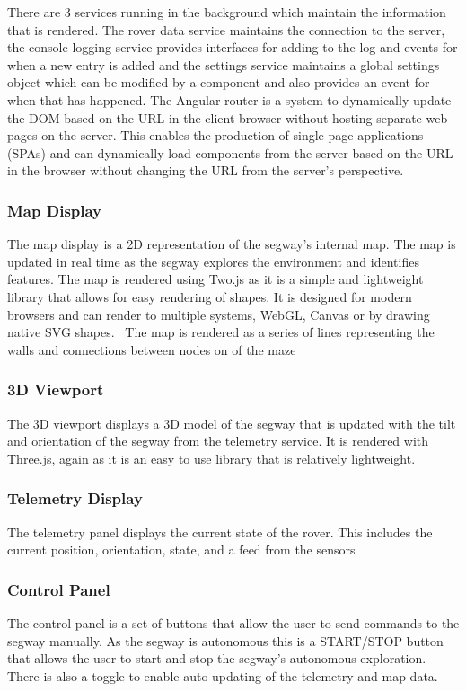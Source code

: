 There are 3 services running in the background which maintain the information that is rendered. 
The rover data service maintains the connection to the server, 
the console logging service provides interfaces for adding to the log and events for when a new entry is added and the settings service maintains a global settings object which can be modified by a component and also provides an event for when that has happened.
The Angular router is a system to dynamically update the DOM based on the URL in the client browser without hosting separate web pages on the server. This enables the production of single page applications (SPAs) and can dynamically load components from the server based on the URL in the browser without changing the URL from the server’s perspective.~\cite{ref:angular_router}

\subsubsection*{Map Display}
The map display is a 2D representation of the segway's internal map. The map is updated in real time as the segway explores the environment and identifies features. The map is rendered using Two.js as it is a simple and lightweight library that allows for easy rendering of shapes. It is designed for modern browsers and can render to multiple systems, WebGL, Canvas or by drawing native SVG shapes.~\cite{ref:twojs} The map is rendered as a series of lines representing the walls and connections between nodes on of the maze

\subsubsection*{3D Viewport}
The 3D viewport displays a 3D model of the segway that is updated with the tilt and orientation of the segway from the telemetry service. It is rendered with Three.js, again as it is an easy to use library that is relatively lightweight.~\cite{ref:threejs}

\subsubsection*{Telemetry Display}
The telemetry panel displays the current state of the rover. This includes the current position, orientation, state, and a feed from the sensors

\subsubsection*{Control Panel}
The control panel is a set of buttons that allow the user to send commands to the segway manually. As the segway is autonomous this is a START/STOP button that allows the user to start and stop the segway's autonomous exploration. There is also a toggle to enable auto-updating of the telemetry and map data.

